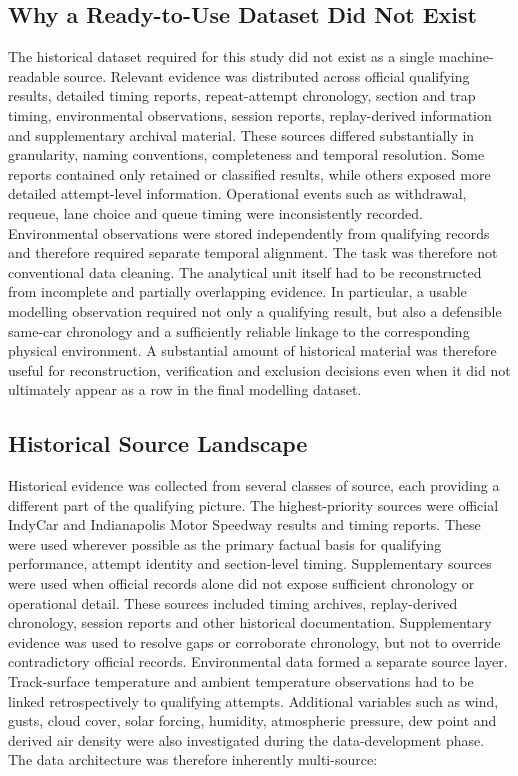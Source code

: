 \subsection{Why a Ready-to-Use Dataset Did Not Exist}
The historical dataset required for this study did not exist as a single machine-readable source. Relevant evidence was distributed across official qualifying results, detailed timing reports, repeat-attempt chronology, section and trap timing, environmental observations, session reports, replay-derived information and supplementary archival material. These sources differed substantially in granularity, naming conventions, completeness and temporal resolution. Some reports contained only retained or classified results, while others exposed more detailed attempt-level information. Operational events such as withdrawal, requeue, lane choice and queue timing were inconsistently recorded. Environmental observations were stored independently from qualifying records and therefore required separate temporal alignment. The task was therefore not conventional data cleaning. The analytical unit itself had to be reconstructed from incomplete and partially overlapping evidence. In particular, a usable modelling observation required not only a qualifying result, but also a defensible same-car chronology and a sufficiently reliable linkage to the corresponding physical environment. A substantial amount of historical material was therefore useful for reconstruction, verification and exclusion decisions even when it did not ultimately appear as a row in the final modelling dataset.

\subsection{Historical Source Landscape}
Historical evidence was collected from several classes of source, each providing a different part of the qualifying picture. The highest-priority sources were official IndyCar and Indianapolis Motor Speedway results and timing reports. These were used wherever possible as the primary factual basis for qualifying performance, attempt identity and section-level timing. Supplementary sources were used when official records alone did not expose sufficient chronology or operational detail. These sources included timing archives, replay-derived chronology, session reports and other historical documentation. Supplementary evidence was used to resolve gaps or corroborate chronology, but not to override contradictory official records. Environmental data formed a separate source layer. Track-surface temperature and ambient temperature observations had to be linked retrospectively to qualifying attempts. Additional variables such as wind, gusts, cloud cover, solar forcing, humidity, atmospheric pressure, dew point and derived air density were also investigated during the data-development phase. The data architecture was therefore inherently multi-source:

